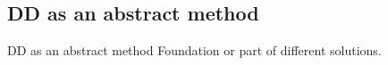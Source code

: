 \subsection{DD as an abstract method}
\begin{frame}{DD as an abstract method}
	Foundation or part of different solutions.
\end{frame}
